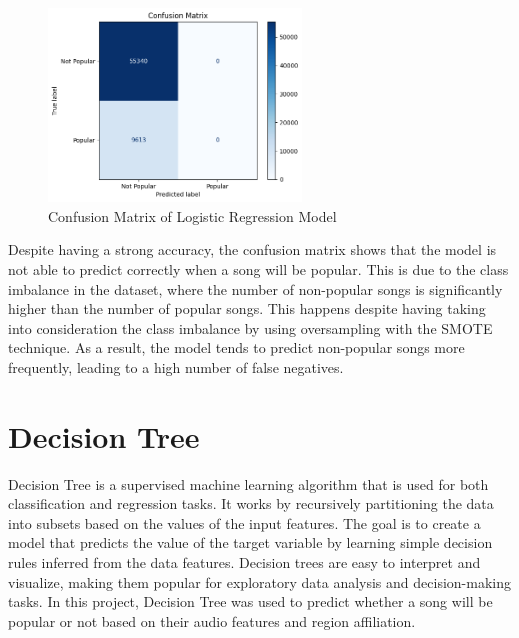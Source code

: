 \begin{figure}[h] 
    \centering 
    \includegraphics[width=0.6\textwidth]{media/log_reg_confusionmatrix.png}
    \caption{Confusion Matrix of Logistic Regression Model}

\end{figure}

Despite having a strong accuracy, the confusion matrix shows that the model is not able to predict correctly when a song will be popular. This is due to the class imbalance in the dataset, where the number of non-popular songs is significantly higher than the number of popular songs. This happens despite having taking into consideration the class imbalance by using oversampling with the SMOTE technique.
As a result, the model tends to predict non-popular songs more frequently, leading to a high number of false negatives. 


\newpage

\section{Decision Tree}

Decision Tree is a supervised machine learning algorithm that is used for both classification and regression tasks. It works by recursively partitioning the data into subsets based on the values of the input features. The goal is to create a model that predicts the value of the target variable by learning simple decision rules inferred from the data features. Decision trees are easy to interpret and visualize, making them popular for exploratory data analysis and decision-making tasks. In this project, Decision Tree was used to predict whether a song will be popular or not based on their audio features and region affiliation. \\

